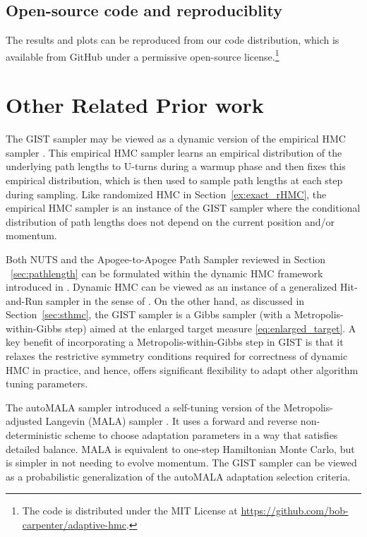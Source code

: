\documentclass[letterpaper,11pt]{article}
\theoremstyle{plain}%
\theoremstyle{remark}
\begin{document}
\subsection{Open-source code and reproduciblity}

The results and plots can be reproduced from our code distribution, which is available from GitHub under a permissive open-source license.\footnote{The code is distributed under the MIT License at \url{https://github.com/bob-carpenter/adaptive-hmc}.}

\section{Other Related Prior work}

The GIST sampler may be viewed as a dynamic version of the empirical HMC sampler \cite{wu2018faster}. This empirical HMC sampler learns an empirical distribution of the underlying path lengths to U-turns during a warmup phase and then fixes this empirical distribution, which is then used to sample path lengths at each step during sampling. Like randomized HMC in Section~\ref{ex:exact_rHMC}, the empirical HMC sampler is an instance of the GIST sampler where the conditional distribution of path lengths does not depend on the current position and/or momentum.

Both NUTS and the Apogee-to-Apogee Path Sampler reviewed in Section ~\ref{sec:pathlength} can be formulated within the dynamic HMC framework introduced in \cite{durmus2023convergence}. Dynamic HMC can be viewed as an instance of a generalized Hit-and-Run sampler in the sense of \cite{Diaconis2007HitandRun}. On the other hand, as discussed in Section~\ref{sec:sthmc}, the GIST sampler is a Gibbs sampler (with a Metropolis-within-Gibbs step) aimed at the enlarged target measure \eqref{eq:enlarged_target}.  A key benefit of incorporating a Metropolis-within-Gibbs step in GIST is that it relaxes the restrictive symmetry conditions required for correctness of dynamic HMC in practice, and hence, offers significant flexibility to adapt other algorithm tuning parameters.

The autoMALA sampler introduced a self-tuning version of the Metropolis-adjusted Langevin (MALA) sampler \cite{kleppe2016adaptive,biron2024automala}.  It uses a forward and reverse non-deterministic scheme to choose adaptation parameters in a way that satisfies detailed balance. MALA is equivalent to one-step Hamiltonian Monte Carlo, but is simpler in not needing to evolve momentum.  The GIST sampler can be viewed as a probabilistic generalization of the autoMALA adaptation selection criteria.
\end{document}
